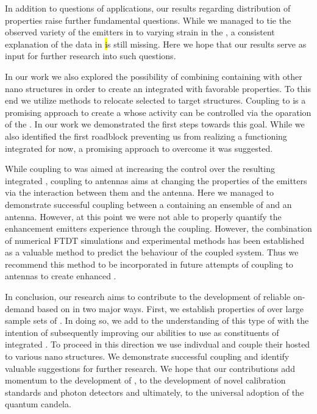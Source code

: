    In addition to questions of applications, our results regarding distribution of \siv properties raise further fundamental questions. While we managed to tie the observed variety of the emitters in \vl to varying strain in the \nds, a consistent explanation of the data in \hl is still missing. Here we hope that our results serve as input for further research into such questions.

   In our work we also explored the possibility of combining \nds containing \sivs with other nano structures in order to create an integrated \sps with favorable properties. To this end we utilize \pp methods to relocate selected \nds to target structures. Coupling \nds to \VCSELs is a promising approach to create a \sps whose activity can be controlled via the oparation of the \VCSELs. In our work we demonstrated the first steps towards this goal. While we also identified the first roadblock preventing us from realizing a functioning integrated \sps for now, a promising approach to overcome it was suggested.

   While coupling to \VCSELs was aimed at increasing the control over the resulting integrated \sps, coupling to antennas aims at changing the properties of the emitters via the interaction between them and the antenna. Here we managed to demonstrate successful coupling between a \nd containing an ensemble of \sivs and an antenna. However, at this point we were not able to properly quantify the enhancement emitters experience through the coupling. However, the combination of numerical FTDT simulations and experimental methods has been established as a valuable method to predict the behaviour of the coupled system. Thus we recommend this method to be incorporated in future attempts of coupling \sivs to antennas to create enhanced \sps.

   In conclusion, our research aims to contribute to the development of reliable on-demand \sps based on \sivs in two major ways. First, we establish properties of \sivs over large sample sets of \nds. In doing so, we add to the understanding of this type of \cc with the intention of subsequently improving our abilities to use \sivs as constituents of integrated \sps. To proceed in this direction we use indivdual \nds and couple their hosted \sivs to various nano structures. We demonstrate successful coupling and identify valuable suggestions for further research.
   We hope that our contributions add momentum to the development of \sps, to the development of novel calibration standards and photon detectors and ultimately, to the universal adoption of the quantum candela.
